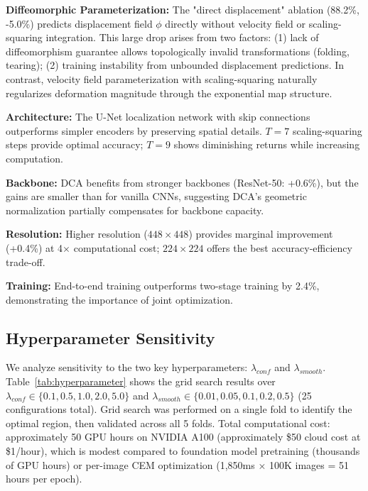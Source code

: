 \documentclass[final,3p,times,review,sort&compress]{elsarticle}
\begin{document}
\textbf{Diffeomorphic Parameterization:} The "direct displacement" ablation (88.2\%, -5.0\%) predicts displacement field $\phi$ directly without velocity field or scaling-squaring integration. This large drop arises from two factors: (1) lack of diffeomorphism guarantee allows topologically invalid transformations (folding, tearing); (2) training instability from unbounded displacement predictions. In contrast, velocity field parameterization with scaling-squaring naturally regularizes deformation magnitude through the exponential map structure.

\textbf{Architecture:} The U-Net localization network with skip connections outperforms simpler encoders by preserving spatial details. $T=7$ scaling-squaring steps provide optimal accuracy; $T=9$ shows diminishing returns while increasing computation.

\textbf{Backbone:} DCA benefits from stronger backbones (ResNet-50: +0.6\%), but the gains are smaller than for vanilla CNNs, suggesting DCA's geometric normalization partially compensates for backbone capacity.

\textbf{Resolution:} Higher resolution ($448 \times 448$) provides marginal improvement (+0.4\%) at 4$\times$ computational cost; $224 \times 224$ offers the best accuracy-efficiency trade-off.

\textbf{Training:} End-to-end training outperforms two-stage training by 2.4\%, demonstrating the importance of joint optimization.

\subsection{Hyperparameter Sensitivity}
\label{sec:hyperparam}

We analyze sensitivity to the two key hyperparameters: $\lambda_{conf}$ and $\lambda_{smooth}$. Table~\ref{tab:hyperparameter} shows the grid search results over $\lambda_{conf} \in \{0.1, 0.5, 1.0, 2.0, 5.0\}$ and $\lambda_{smooth} \in \{0.01, 0.05, 0.1, 0.2, 0.5\}$ (25 configurations total). Grid search was performed on a single fold to identify the optimal region, then validated across all 5 folds. Total computational cost: approximately 50 GPU hours on NVIDIA A100 (approximately \$50 cloud cost at \$1/hour), which is modest compared to foundation model pretraining (thousands of GPU hours) or per-image CEM optimization (1,850ms × 100K images = 51 hours per epoch).
\end{document}
